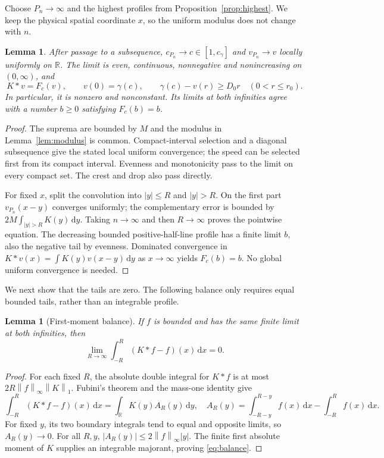 \documentclass[11pt,a4paper]{article}
\newtheorem{lemma}[theorem]{Lemma}
\theoremstyle{remark}
\newcommand{\R}{\mathbb R}
\newcommand{\cg}{c_\gamma}
\newcommand{\dd}{\,\mathrm d}
\newcommand{\norm}[1]{\left\lVert#1\right\rVert}
\begin{document}
Choose $P_n\to\infty$ and the highest profiles from
Proposition~\ref{prop:highest}. We keep the physical spatial coordinate
$x$, so the uniform modulus does not change with $n$.

\begin{lemma}\label{lem:limit}
After passage to a subsequence, $c_{P_n}\to c\in[1,\cg]$ and
$v_{P_n}\to v$ locally uniformly on $\R$. The limit is even,
continuous, nonnegative and nonincreasing on $(0,\infty)$, and
\begin{equation}\label{eq:limit-profile}
 K*v=F_c(v),\qquad v(0)=\gamma(c),\qquad
 \gamma(c)-v(r)\ge D_0r\quad(0<r\le r_0).
\end{equation}
In particular, it is nonzero and nonconstant. Its limits at both
infinities agree with a number $b\ge0$ satisfying $F_c(b)=b$.
\end{lemma}
\begin{proof}
The suprema are bounded by $M$ and the modulus in
Lemma~\ref{lem:modulus} is common. Compact-interval selection and a
diagonal subsequence give the stated local uniform convergence; the
speed can be selected first from its compact interval. Evenness and
monotonicity pass to the limit on every compact set. The crest and drop
also pass directly.

For fixed $x$, split the convolution into $|y|\le R$ and $|y|>R$.
On the first part $v_{P_n}(x-y)$ converges uniformly; the complementary
error is bounded by $2M\int_{|y|>R}K(y)\dd y$. Taking $n\to\infty$
and then $R\to\infty$ proves the pointwise equation. The decreasing
bounded positive-half-line profile has a finite limit $b$, also the
negative tail by evenness. Dominated convergence in
$K*v(x)=\int K(y)v(x-y)\dd y$ as $x\to\infty$ yields
$F_c(b)=b$. No global uniform convergence is needed.
\end{proof}

We next show that the tails are zero. The following balance only requires
equal bounded tails, rather than an integrable profile.
\begin{lemma}[First-moment balance]\label{lem:balance}
If $f$ is bounded and has the same finite limit at both infinities, then
\begin{equation}\label{eq:balance}
 \lim_{R\to\infty}\int_{-R}^R(K*f-f)(x)\dd x=0.
\end{equation}
\end{lemma}
\begin{proof}
For each fixed $R$, the absolute double integral for $K*f$ is at most
$2R\norm{f}_\infty\norm{K}_1$. Fubini's theorem and the mass-one
identity give
\[
 \int_{-R}^R(K*f-f)(x)\dd x=\int_\R K(y)A_R(y)\dd y,
 \quad
 A_R(y)=\int_{-R-y}^{R-y}f(x)\dd x-\int_{-R}^Rf(x)\dd x.
\]
For fixed $y$, its two boundary integrals tend to equal and opposite
limits, so $A_R(y)\to0$. For all $R,y$,
$|A_R(y)|\le2\norm{f}_\infty|y|$. The finite first absolute moment
of $K$ supplies an integrable majorant, proving \eqref{eq:balance}.
\end{proof}
\end{document}
